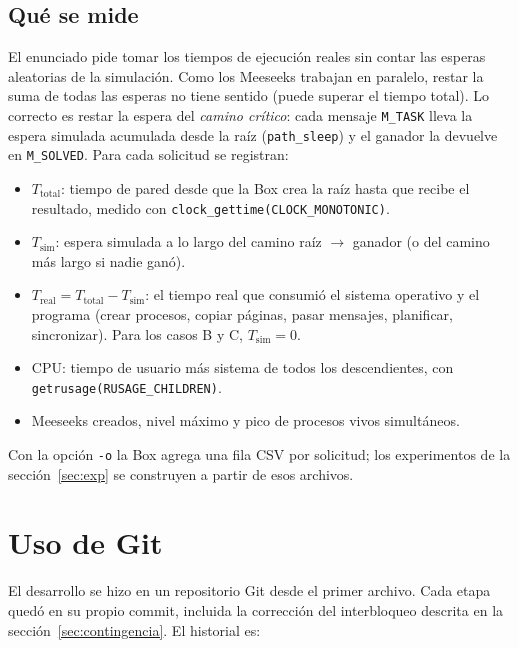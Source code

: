 \documentclass[11pt,letterpaper]{article}
\makeatletter
\newcommand{\codigo}[2]{%
  \edef\lin{\csname line@#1\endcsname}%
  }
\newcommand{\Tt}{T_{\text{total}}}
\newcommand{\Ts}{T_{\text{sim}}}
\newcommand{\Tr}{T_{\text{real}}}
\makeatother
\begin{document}
\codigo{runtask}{La Box atendiendo una solicitud}

\subsection{Qué se mide}\label{sec:medidas}

El enunciado pide tomar los tiempos de ejecución reales sin contar las esperas aleatorias
de la simulación. Como los Meeseeks trabajan en paralelo, restar la suma de todas las
esperas no tiene sentido (puede superar el tiempo total). Lo correcto es restar la espera
del \emph{camino crítico}: cada mensaje \texttt{M\_TASK} lleva la espera simulada acumulada
desde la raíz (\texttt{path\_sleep}) y el ganador la devuelve en \texttt{M\_SOLVED}. Para
cada solicitud se registran:

\begin{itemize}[leftmargin=1.5em]
\item $\Tt$: tiempo de pared desde que la Box crea la raíz hasta que recibe el resultado,
  medido con \texttt{clock\_gettime(CLOCK\_MONOTONIC)}.
\item $\Ts$: espera simulada a lo largo del camino raíz $\to$ ganador (o del camino más
  largo si nadie ganó).
\item $\Tr=\Tt-\Ts$: el tiempo real que consumió el sistema operativo y el programa
  (crear procesos, copiar páginas, pasar mensajes, planificar, sincronizar). Para los
  casos B y C, $\Ts=0$.
\item CPU: tiempo de usuario más sistema de todos los descendientes, con
  \texttt{getrusage(RUSAGE\_CHILDREN)}.
\item Meeseeks creados, nivel máximo y pico de procesos vivos simultáneos.
\end{itemize}

Con la opción \texttt{-o} la Box agrega una fila CSV por solicitud; los experimentos de la
sección~\ref{sec:exp} se construyen a partir de esos archivos.

\section{Uso de Git}\label{sec:git}

El desarrollo se hizo en un repositorio Git desde el primer archivo. Cada etapa quedó en
su propio commit, incluida la corrección del interbloqueo descrita en la
sección~\ref{sec:contingencia}. El historial es:
\end{document}
